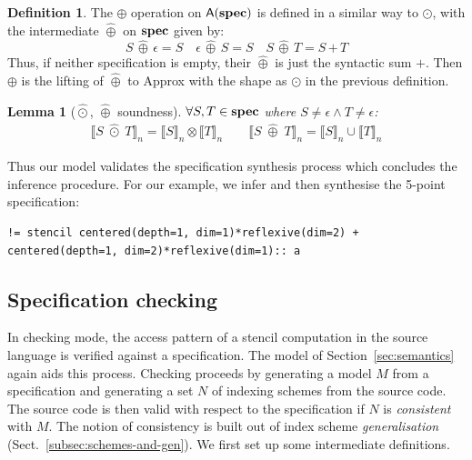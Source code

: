 \documentclass[9pt,preprint]{sigplanconf}
\newcounter{block}
\newtheorem{lemma}[block]{Lemma}
\theoremstyle{definition}
\newtheorem{definition}[block]{Definition}
\newcommand{\interp}[1]{\llbracket{#1}\rrbracket}
\newcommand{\term}[1]{\texttt{#1}}
\begin{document}
\begin{definition}The $\oplus$ operation on $\textsf{A}(\textbf{spec})$ 
is defined in a similar way to $\odot$, with the intermediate $\hat{\oplus}$ on
$\textbf{spec}$ given by:
\begin{equation*}
S \,\hat{\oplus}\, \epsilon = S \quad
\epsilon \,\hat{\oplus}\, S = S \quad
S \, \hat{\oplus} \, T = S \, \term{+} \, T
\end{equation*}
Thus, if neither specification is empty, their $\hat{\oplus}$ is just
the syntactic sum $\term{+}$. Then $\oplus$ is the lifting of
$\hat{\oplus}$ to \textsf{Approx} with the shape as $\odot$ in the previous
definition.
\end{definition}

\begin{lemma}[$\hat{\odot}$, $\hat{\oplus}$ soundness]$\forall S,
  T \in \textbf{spec}$ where $S\!\neq \epsilon \wedge T\!\neq \epsilon$:
\begin{align*}
\interp{S \; \hat{\odot} \; T}_n = \interp{S}_n \otimes \interp{T}_n
  \qquad
\interp{S \; \hat{\oplus} \; T}_n = \interp{S}_n \cup \interp{T}_n
\end{align*}
\label{lem:alg-soundness}
\vspace{-2em}
\end{lemma}
%
\noindent
Thus our model validates the specification synthesis process which concludes the
inference procedure. For our example, we infer and then synthesise the
5-point specification:
\begin{verbatim}
!= stencil centered(depth=1, dim=1)*reflexive(dim=2) + centered(depth=1, dim=2)*reflexive(dim=1):: a
\end{verbatim}

\subsection{Specification checking\label{subsec:checking}}

In checking mode, the access pattern of a stencil computation in the
source language is verified against a specification. The model of
Section~\ref{sec:semantics} again aids this process.  Checking
proceeds by generating a model $M$ from a specification and generating a set $N$ of indexing
schemes from the source code. The source code is then valid with
respect to the specification if $N$ is \emph{consistent} with $M$. The
notion of consistency is built out of index scheme 
\emph{generalisation} (Sect.~\ref{subsec:schemes-and-gen}). 
We first set up some intermediate definitions.%
\end{document}
